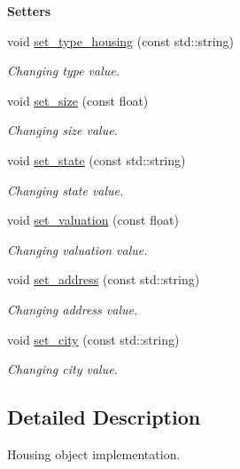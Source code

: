 \begin{Indent}{\bf Setters}\par
\begin{DoxyCompactItemize}
\item 
void \hyperlink{class_c_housing_aa3d4063bf93f2cdbddd9ae16f0363893}{set\+\_\+type\+\_\+housing} (const std\+::string)
\begin{DoxyCompactList}\small\item\em Changing type value. \end{DoxyCompactList}\item 
void \hyperlink{class_c_housing_ab6a8eaa28937e9728c939d54f1f101c8}{set\+\_\+size} (const float)
\begin{DoxyCompactList}\small\item\em Changing size value. \end{DoxyCompactList}\item 
void \hyperlink{class_c_housing_ab8ef7d502de4f36057639debd22a5d32}{set\+\_\+state} (const std\+::string)
\begin{DoxyCompactList}\small\item\em Changing state value. \end{DoxyCompactList}\item 
void \hyperlink{class_c_housing_a6542b420e5405667818649fc6a4131fc}{set\+\_\+valuation} (const float)
\begin{DoxyCompactList}\small\item\em Changing valuation value. \end{DoxyCompactList}\item 
void \hyperlink{class_c_housing_a340ba44629ad45a5739af0a5f79c78da}{set\+\_\+address} (const std\+::string)
\begin{DoxyCompactList}\small\item\em Changing address value. \end{DoxyCompactList}\item 
void \hyperlink{class_c_housing_abc5cac82dfc78666381d49e6aa3140fb}{set\+\_\+city} (const std\+::string)
\begin{DoxyCompactList}\small\item\em Changing city value. \end{DoxyCompactList}\end{DoxyCompactItemize}
\end{Indent}


\subsection{Detailed Description}
Housing object implementation. 

